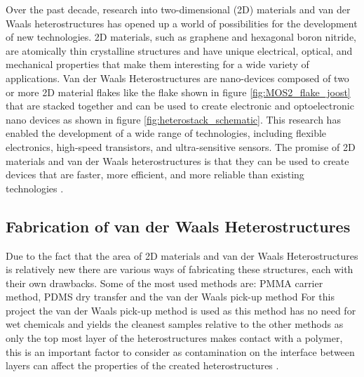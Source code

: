 \documentclass[10pt]{article}
\begin{document}
Over the past decade, research into two-dimensional (2D) materials and van der Waals heterostructures has opened up a world of possibilities for the development of new technologies. 2D materials, such as graphene and hexagonal boron nitride, are atomically thin crystalline structures and have unique electrical, optical, and mechanical properties that make them interesting for a wide variety of applications.
Van der Waals Heterostructures are nano-devices composed of two or more 2D material flakes like the flake shown in figure \ref{fig:MOS2_flake_joost} that are stacked together and can be used to create electronic and optoelectronic nano devices as shown in figure \ref{fig:heterostack_schematic}.
This research has enabled the development of a wide range of technologies, including flexible electronics, high-speed transistors, and ultra-sensitive sensors. 
The promise of 2D materials and van der Waals heterostructures is that they can be used to create devices that are faster, more efficient, and more reliable than existing technologies \cite{geimVanWaalsHeterostructures2013}.

\subsection{Fabrication of van der Waals Heterostructures}
Due to the fact that the area of 2D materials and van der Waals Heterostructures is relatively new there are various ways of fabricating these structures, each with their own drawbacks.
Some of the most used methods are: PMMA carrier method, PDMS dry transfer and the van der Waals pick-up method
For this project the van der Waals pick-up method is used as this method has no need for wet chemicals and yields the cleanest samples relative to the other methods as only the top most layer of the heterostructures makes contact with a polymer, this is an important factor to consider as contamination on the interface between layers can affect the properties of the created heterostructures \cite{pizzoccheroHotPickupTechnique2016,frisendaRecentProgressAssembly2018}.\\
\end{document}
